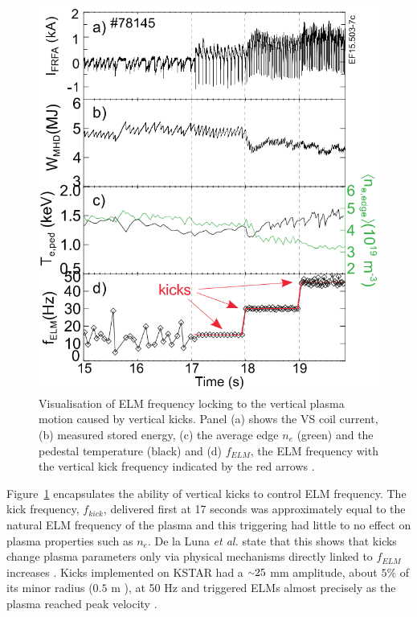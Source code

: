 \documentclass[11pt, twocolumn]{article}  %
\providecommand{\squiggle}{\raise.17ex\hbox{$\scriptstyle\sim$}} %
\begin{document}
\begin{figure}
\includegraphics[scale=0.4]{Figures/VKdata.PNG}
\centering
\caption{Visualisation of ELM frequency locking to the vertical plasma motion caused by vertical kicks. Panel (a) shows the VS coil current, (b) measured stored energy, (c) the average edge $n_e$ (green) and the pedestal temperature (black) and (d) $f_{ELM}$, the ELM frequency with the vertical kick frequency indicated by the red arrows \cite{DelaLuna2016}.}\label{fig:VKdata}
\end{figure}

Figure~\ref{fig:VKdata} encapsulates the ability of vertical kicks to control ELM frequency. The kick frequency, $f_{kick}$, delivered first at 17 seconds was approximately equal to the natural ELM frequency of the plasma and this triggering had little to no effect on plasma properties such as $n_e$. De la Luna \textit{et al.} state that this shows that kicks change plasma parameters only via physical mechanisms directly linked to $f_{ELM}$ increases \cite{DelaLuna2016}. Kicks implemented on KSTAR had a $\squiggle 25$ mm amplitude, about $5\%$ of its minor radius ($0.5$ m \cite{Choi1998}), at 50 Hz and triggered ELMs almost precisely as the plasma reached peak velocity \cite{Kim2012}.
\end{document}
